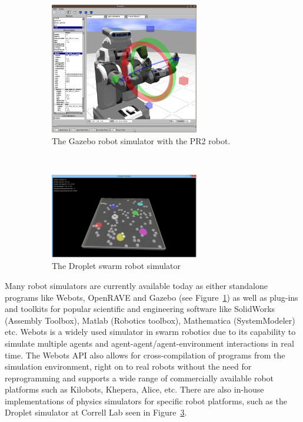 \documentclass[Main.tex]{subfiles}
\begin{document}
\begin{figure}[!ht]
\begin{subfigure}{.5\textwidth}
\centering\includegraphics[width=6.5cm]{assets/gazebo.png}
\centering\caption{The Gazebo robot simulator with the PR2 robot.\footnotemark}\label{fig:gazebo}
\end{subfigure}~
\begin{subfigure}{.5\textwidth}
\centering\includegraphics[width=6.5cm]{assets/dsim.png}
\centering\caption{The Droplet swarm robot simulator}\label{fig:dropletsim}
\end{subfigure}
\caption{}
\end{figure}

Many robot simulators are currently available today as either standalone programs like Webots, OpenRAVE and Gazebo (see Figure~\ref{fig:gazebo}) as well as plug-ins and toolkits for popular scientific and engineering software like SolidWorks (Assembly Toolbox), Matlab (Robotics toolbox), Mathematica (SystemModeler) etc. Webots is a widely used simulator in swarm robotics due to its capability to simulate multiple agents and agent-agent/agent-environment interactions in real time. The Webots API also allows for cross-compilation of programs from the simulation environment, right on to real robots without the need for reprogramming and supports a wide range of commercially available robot platforms such as Kilobots, Khepera, Alice, etc. There are also in-house implementations of physics simulators for specific robot platforms, such as the Droplet simulator at Correll Lab seen in Figure~\ref{fig:dropletsim}. 
\end{document}
